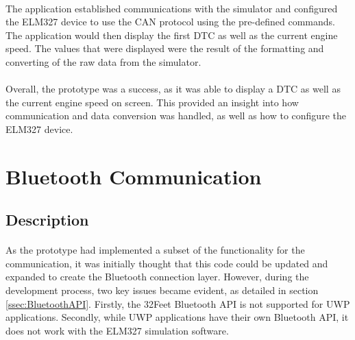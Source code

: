 	\paragraph{}{
	The application established communications with the simulator and configured the ELM327 device to use the CAN protocol using the pre-defined commands. The application would then display the first DTC as well as the current engine speed. The values that were displayed were the result of the formatting and converting of the raw data from the simulator.
	}
	\paragraph{}{	
	Overall, the prototype was a success, as it was able to display a DTC as well as the current engine speed on screen. This provided an insight into how communication and data conversion was handled, as well as how to configure the ELM327 device.
	}

\section{Bluetooth Communication}
	\subsection{Description}
		\paragraph{}{
		As the prototype had implemented a subset of the functionality for the communication, it was initially thought that this code could be updated and expanded to create the Bluetooth connection layer. However, during the development process, two key issues became evident, as detailed in section \ref{ssec:BluetoothAPI}. Firstly, the 32Feet Bluetooth API is not supported for UWP applications. Secondly, while UWP applications have their own Bluetooth API, it does not work with the ELM327 simulation software.
		}
